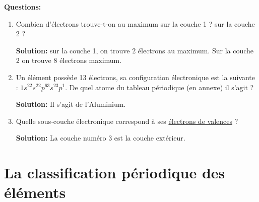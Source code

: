 \documentclass[french]{article}
\begin{document}
\noindent\textbf{Questions:}\medskip

\begin{enumerate}
\item Combien d'électrons trouve-t-on au maximum sur la couche 1 ? sur la couche 2 ? 

\textbf{Solution:} sur la couche 1, on trouve 2 électrons au maximum. Sur la couche 2 on trouve 8 électrons maximum.

\item Un élément possède 13 électrons, sa configuration électronique est la suivante : $1s^22s^22p^63s^23p^1$. De quel atome du tableau périodique (en annexe) il s'agit ?

\textbf{Solution:} Il s'agit de l'Aluminium.

\item Quelle sous-couche électronique correspond à ses \underline{électrons de valences} ?

\textbf{Solution:} La couche numéro 3 est la couche extérieur.

\end{enumerate}


\section{La classification périodique des éléments}
\end{document}
